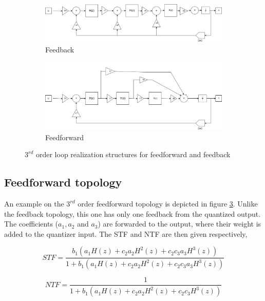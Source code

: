 \begin{figure}[H]
\centering
\begin{subfigure}[b]{0.85\textwidth}
   \includegraphics[width=\textwidth]{images/feedback.png}
   \caption{Feedback}
   \label{fig:back} 
\end{subfigure}

\begin{subfigure}[b]{0.85\textwidth}
   \includegraphics[width=\textwidth]{images/feedforward_no.png}
   \caption{Feedforward}
   \label{fig:forward}
\end{subfigure}

\caption{$3^{rd}$ order loop realization structures for feedforward and feedback}
\end{figure}

\subsection{Feedforward topology}
An example on the $3^{rd}$ order feedforward topology is depicted in figure \ref{fig:forward}. Unlike the feedback topology, this one has only one feedback from the quantized output. The coefficients ($a_1, a_2$ and $a_3$) are forwarded to the output, where their weight is added to the quantizer input. The STF and NTF are then given respectively,

\begin{equation}
    STF = \frac{b_1(a_1H(z) + c_2a_2H^2(z) + c_2c_3a_3H^3(z))}{1 + b_1(a_1H(z) + c_2a_2H^2(z) + c_2c_3a_3H^3(z))}
\end{equation}

\begin{equation}
    NTF = \frac{1}{1 + b_1(a_1H(z) + c_2a_2H^2(z) + c_2c_3H^3(z))}
\end{equation}

